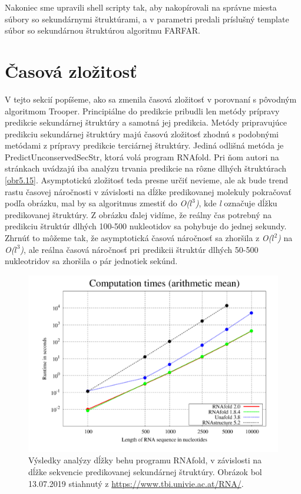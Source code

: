\indent Nakoniec sme upravili shell scripty tak, aby nakopírovali na správne miesta súbory so sekundárnymi štruktúrami, a v parametri predali príslušný template súbor so sekundárnou štruktúrou algoritmu FARFAR.


\section{Časová zložitosť}
V tejto sekcií popíšeme, ako sa zmenila časová zložitosť v porovnaní s pôvodným algoritmom Trooper.
Principiálne do predikcie pribudli len metódy prípravy predikcie sekundárnej štruktúry a samotná jej predikcia. Metódy pripravujúce predikciu sekundárnej štruktúry majú časovú zložitosť zhodnú s podobnými metódami z prípravy predikcie terciárnej štruktúry. Jediná odlišná metóda je PredictUnconservedSecStr, ktorá volá program RNAfold. Pri ňom autori na stránkach uvádzajú iba analýzu trvania predikcie na rôzne dlhých štruktúrach \autoref{obr5.15}. Asymptotickú zložitosť teda presne určiť nevieme, ale ak bude trend rastu časovej náročnosti v závislosti na dĺžke predikovanej molekuly pokračovať podľa obrázku, mal by sa algoritmus zmestiť do \textit{O($l^3$)}, kde \textit{l} označuje dĺžku predikovanej štruktúry. Z obrázku ďalej vidíme, že reálny čas potrebný na predikciu štruktúr dlhých 100-500 nukleotidov sa pohybuje do jednej sekundy. Zhrnúť to môžeme tak, že asymptotická časová náročnosť sa zhoršila z  \textit{O($l^2$)} na \textit{O($l^3$)}, ale reálna časová náročnosť pri predikcii štruktúr dlhých 50-500 nukleotridov sa zhoršila o pár jednotiek sekúnd.

\begin{figure}%
\includegraphics[width=\textwidth]{../img/rnafold}
\caption{Výsledky analýzy dĺžky behu programu RNAfold, v závislosti na dĺžke sekvencie predikovanej sekundárnej štruktúry. Obrázok bol 13.07.2019 stiahnutý z \url{https://www.tbi.univie.ac.at/RNA/}.}
\label{obr5.15}
\end{figure}


